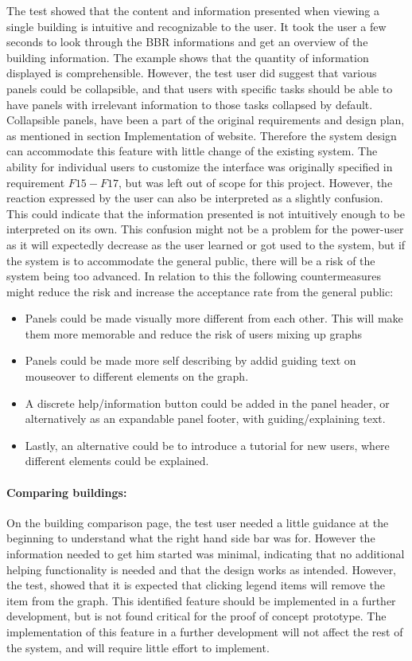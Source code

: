 The test showed that the content and information presented when viewing a single building is intuitive and recognizable to the user. It took the user a few seconds to look through the BBR informations and get an overview of the building information. The example shows that the quantity of information displayed is comprehensible. However, the test user did suggest that various panels could be collapsible, and that users with specific tasks should be able to have panels with irrelevant information to those tasks collapsed by default. Collapsible panels, have been a part of the original requirements and design plan, as mentioned in section Implementation of website. Therefore the system design can accommodate this feature with little change of the existing system. The ability for individual users to customize the interface was originally specified in requirement $F15-F17$, but was left out of scope for this project. However, the reaction expressed by the user can also be interpreted as a slightly confusion. This could indicate that the information presented is not intuitively enough to be interpreted on its own. This confusion might not be a problem for the power-user as it will expectedly decrease as the user learned or got used to the system, but if the system is to accommodate the general public, there will be a risk of the system being too advanced. In relation to this the following countermeasures might reduce the risk and increase the acceptance rate from the general public:
\begin{itemize}
\item Panels could be made visually more different from each other. This will make them more memorable and reduce the risk of users mixing up graphs
\item Panels could be made more self describing by addid guiding text on mouseover to different elements on the graph. 
\item A discrete help/information button could be added in the panel header, or alternatively as an expandable panel footer, with guiding/explaining text. 
\item Lastly, an alternative could be to introduce a tutorial for new users, where different elements could be explained. 
\end{itemize}
\paragraph{Comparing buildings:} 
On the building comparison page, the test user needed a little guidance at the beginning to understand what the right hand side bar was for. However the information needed to get him started was minimal, indicating that no additional helping functionality is needed and that the design works as intended. However, the test, showed that it is expected that clicking legend items will remove the item from the graph. This identified feature should be implemented in a further development, but is not found critical for the proof of concept prototype. The implementation of this feature in a further development will not affect the rest of the system, and will require little effort to implement.
